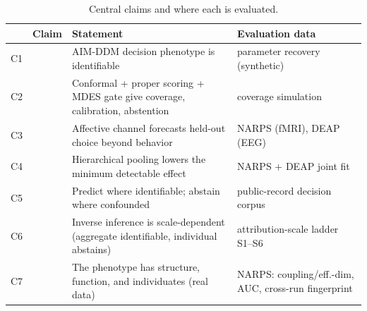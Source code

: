 \begin{table}[t]
\centering
\caption{Central claims and where each is evaluated.}
\label{tab:claims}
\begin{tabular}{llp{4.3cm}l}
\toprule
& Claim & Statement & Evaluation data \\
\midrule
C1 & & AIM-DDM decision phenotype is identifiable & parameter recovery (synthetic) \\
C2 & & Conformal + proper scoring + MDES gate give coverage, calibration, abstention & coverage simulation \\
C3 & & Affective channel forecasts held-out choice beyond behavior & NARPS (fMRI), DEAP (EEG) \\
C4 & & Hierarchical pooling lowers the minimum detectable effect & NARPS $+$ DEAP joint fit \\
C5 & & Predict where identifiable; abstain where confounded & public-record decision corpus \\
C6 & & Inverse inference is scale-dependent (aggregate identifiable, individual abstains) & attribution-scale ladder S1--S6 \\
C7 & & The phenotype has structure, function, and individuates (real data) & NARPS: coupling/eff.-dim, AUC, cross-run fingerprint \\
\bottomrule
\end{tabular}
\end{table}
